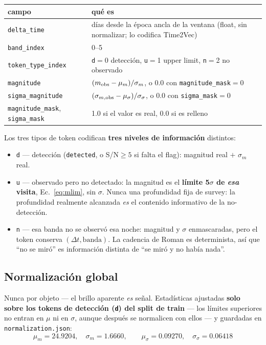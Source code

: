 \documentclass[11pt,a4paper]{article}
\newcommand{\code}[1]{\texttt{\small #1}}
\begin{document}
\begin{center}
\begin{tabularx}{\linewidth}{lX}
\toprule
campo & qué es \\
\midrule
\code{delta\_time} & días desde la época ancla de la ventana (float, sin normalizar; lo codifica Time2Vec) \\
\code{band\_index} & 0--5 \\
\code{token\_type\_index} & \code{d}$=$0 detección, \code{u}$=$1 upper limit, \code{n}$=$2 no observado \\
\code{magnitude} & $(m_{\rm obs} - \mu_m)/\sigma_m$, o 0.0 con \code{magnitude\_mask}$=$0 \\
\code{sigma\_magnitude} & $(\sigma_{m,\rm obs} - \mu_\sigma)/\sigma_\sigma$, o 0.0 con \code{sigma\_mask}$=$0 \\
\code{magnitude\_mask}, \code{sigma\_mask} & 1.0 si el valor es real, 0.0 si es relleno \\
\bottomrule
\end{tabularx}
\end{center}

Los tres tipos de token codifican \textbf{tres niveles de información} distintos:
\begin{itemize}[nosep]
  \item \code{d} --- detección (\code{detected}, o S/N$\ge5$ si falta el flag): magnitud real
        $+$ $\sigma_m$ real.
  \item \code{u} --- observado pero no detectado: la magnitud es el \textbf{límite 5$\sigma$ de
        \emph{esa} visita}, Ec.\ \eqref{eq:mlim}, sin $\sigma$. Nunca una profundidad fija de survey:
        la profundidad realmente alcanzada \emph{es} el contenido informativo de la no-detección.
  \item \code{n} --- esa banda no se observó esa noche: magnitud y $\sigma$ enmascaradas, pero el
        token conserva $(\Delta t, \text{banda})$. La cadencia de Roman es determinista, así que
        ``no se miró'' es información distinta de ``se miró y no había nada''.
\end{itemize}

\subsection{Normalización global}
Nunca por objeto --- el brillo aparente \emph{es} señal. Estadísticas ajustadas \textbf{solo sobre
los tokens de detección (\code{d}) del split de train} --- los límites superiores no entran en
$\mu$ ni en $\sigma$, aunque después se normalicen con ellos --- y guardadas en
\code{normalization.json}:
\[
\mu_m = 24.9204,\quad \sigma_m = 1.6660,\qquad
\mu_\sigma = 0.09270,\quad \sigma_\sigma = 0.06418
\]
\end{document}
